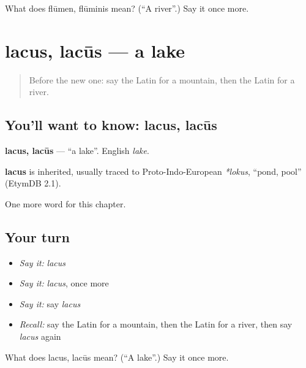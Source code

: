 \begin{tcolorbox}[breakable,colback=teal!4,colframe=teal!35!black,title={Before you move on}]
What does flūmen, flūminis mean? (\textquotedblleft{}A river\textquotedblright{}.) Say it once more.
\end{tcolorbox}
\section[lacus, lacūs]{lacus, lacūs — a lake}

\label{lesson:LA-C87-lacus}



\begin{quote}
Before the new one: say the Latin for a mountain, then the Latin for a river.
\end{quote}

\subsection*{You'll want to know: lacus, lacūs}
\textbf{lacus, lacūs} — \textquotedblleft{}a lake\textquotedblright{}. English \emph{lake}.

\begin{cousinweb}
\textbf{lacus} is inherited, usually traced to Proto-Indo-European \emph{*lokus}, \textquotedblleft{}pond, pool\textquotedblright{} (EtymDB 2.1).
\end{cousinweb}

\begin{grammarlens}[title={What you've built}]
One more word for this chapter.
\end{grammarlens}

\subsection*{Your turn}
\begin{itemize}
\raggedright
  \item \emph{Say it:} \emph{lacus}
  \item \emph{Say it:} \emph{lacus}, once more
  \item \emph{Say it:} say \emph{lacus}
  \item \emph{Recall:} say the Latin for a mountain, then the Latin for a river, then say \emph{lacus} again
\end{itemize}

\begin{tcolorbox}[breakable,colback=teal!4,colframe=teal!35!black,title={Before you move on}]
What does lacus, lacūs mean? (\textquotedblleft{}A lake\textquotedblright{}.) Say it once more.
\end{tcolorbox}
